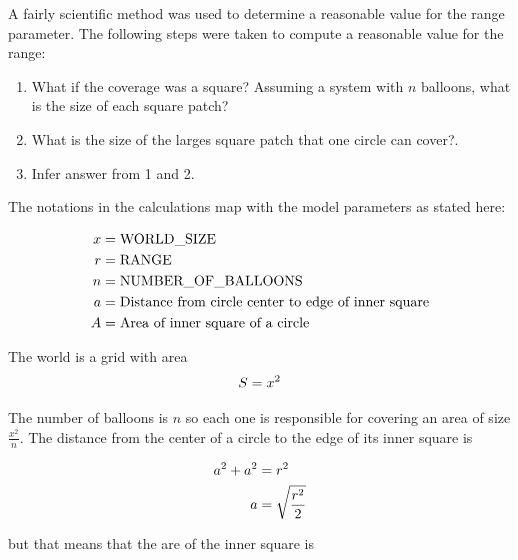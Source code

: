 A fairly scientific method was used to determine a reasonable value for the range parameter. The following steps were taken to compute a reasonable value for the range: 

\begin{enumerate}
    \item What if the coverage was a square? Assuming a system with $n$ balloons, what is the size of each square patch?
    \item What is the size of the larges square patch that one circle can cover?.
    \item Infer answer from 1 and 2.
\end{enumerate}

The notations in the calculations map with the model parameters as stated here:

\begin{align}
    x &= \text{WORLD\_SIZE}\notag \\ 
    r &= \text{RANGE}\notag \\
    n &= \text{NUMBER\_OF\_BALLOONS} \notag \\
    a &= \text{Distance from circle center to edge of inner square} \notag \\
    A &=\text{Area of inner square of a circle} \notag \\
\end{align}

The world is a grid with area 
\begin{align}
S=x^2 \notag
\end{align}

The number of balloons is $n$ so each one is responsible for covering an area of size $\frac{x^2}{n}$. The distance from the center of a circle to the edge of its inner square is

\begin{align} 
a^2 + a^2 &= r^2 \notag \\
a &= \sqrt{\frac{r^2}{2}} \notag
\end{align}

but that means that the are of the inner square is

